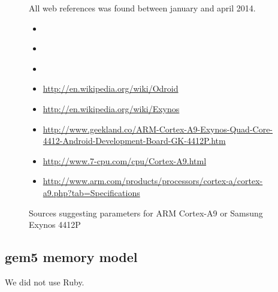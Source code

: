 \begin{figure}
All web references was found between january and april 2014.
\begin{itemize}
    \item{\cite{blem2013detailed}}
    \item{\cite{butko2012accuracy}}
    \item{\cite{armtech}}
    \item{\url{http://en.wikipedia.org/wiki/Odroid}}
    \item{\url{http://en.wikipedia.org/wiki/Exynos}}
    \item{\url{http://www.geekland.co/ARM-Cortex-A9-Exynos-Quad-Core-4412-Android-Development-Board-GK-4412P.htm}}
    \item{\url{http://www.7-cpu.com/cpu/Cortex-A9.html}}
    \item{\url{http://www.arm.com/products/processors/cortex-a/cortex-a9.php?tab=Specifications}}
\end{itemize}
\caption{Sources suggesting parameters for ARM Cortex-A9 or Samsung Exynos 4412P}
\label{fig:a9paramsources}
\end{figure}


\subsection{gem5 memory model}
We did not use Ruby.
